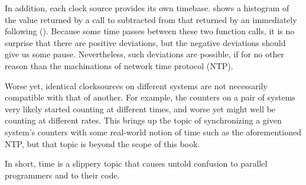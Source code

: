 In addition, each clock source provides its own timebase.
shows a histogram of the value returned by a call to
 subtracted from that returned by an
immediately following 
().
Because some time passes between these two function calls, it is no
surprise that there are positive deviations, but the negative deviations
should give us some pause.
Nevertheless, such deviations are possible, if for no other reason than
the machinations of network time protocol (NTP).

Worse yet, identical clocksources on different systems
are not necessarily compatible with that of another.
For example, the  counters on a pair of systems very likely
started counting at different times, and worse yet might well be counting
at different rates.
This brings up the topic of synchronizing a given system's counters
with some real-world notion of time such as the aforementioned NTP,
but that topic is beyond the scope of this book.

In short, time is a slippery topic that causes untold confusion to
parallel programmers and to their code.
